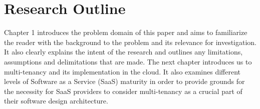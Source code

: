\section{Research Outline}

Chapter 1 introduces the problem domain of this paper and aims to familiarize the reader with the background to the problem and its relevance for investigation. It also clearly explains the intent of the research and outlines any limitations, assumptions and delimitations that are made. The next chapter introduces us to multi-tenancy and its implementation in the cloud. It also examines different levels of Software as a Service (SaaS) maturity in order to provide grounds for the necessity for SaaS providers to consider multi-tenancy as a crucial part of their software design architecture.